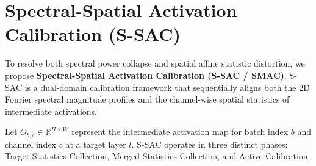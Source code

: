 \documentclass{article}
\theoremstyle{plain}
\theoremstyle{definition}
\theoremstyle{remark}
\begin{document}
\section{Spectral-Spatial Activation Calibration (S-SAC)}
\label{sec:methodology}
To resolve both spectral power collapse and spatial affine statistic distortion, we propose \textbf{Spectral-Spatial Activation Calibration (S-SAC / SMAC)}. S-SAC is a dual-domain calibration framework that sequentially aligns both the 2D Fourier spectral magnitude profiles and the channel-wise spatial statistics of intermediate activations.

Let $O_{b,c} \in \mathbb{R}^{H \times W}$ represent the intermediate activation map for batch index $b$ and channel index $c$ at a target layer $l$. S-SAC operates in three distinct phases: Target Statistics Collection, Merged Statistics Collection, and Active Calibration.
\end{document}
